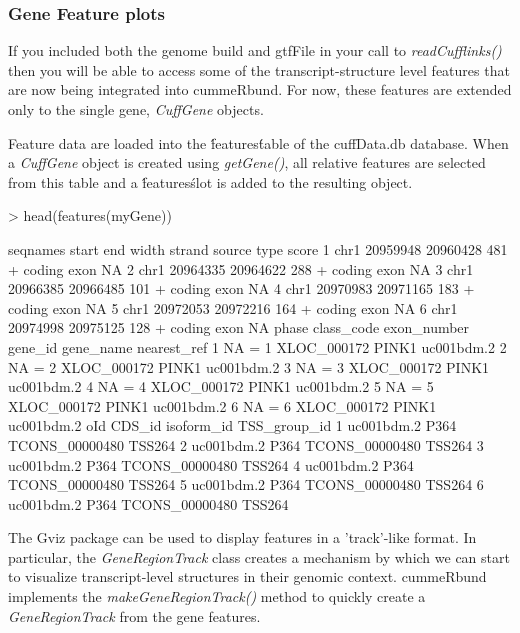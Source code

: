 \documentclass[10pt]{article}
\newcommand{\Rpackage}[1]{\textsf{#1}}
\newcommand{\Rclass}[1]{{\textit{#1}}}
\newcommand{\Rmethod}[1]{{\textit{#1}}}
\begin{document}
\clearpage

\subsubsection{Gene Feature plots}
If you included both the genome build and gtfFile in your call to \Rmethod{readCufflinks()} then you will be able to access some of the transcript-structure level features that are now being integrated into cummeRbund. For now, these features are extended only to the single gene, \Rclass{CuffGene} objects.

Feature data are loaded into the \'features\' table of the cuffData.db database. When a \Rclass{CuffGene} object is created using \Rmethod{getGene()}, all relative features are selected from this table and a \'features\' slot is added to the resulting object.

\begin{Schunk}
\begin{Sinput}
> head(features(myGene))
\end{Sinput}
\begin{Soutput}
  seqnames    start      end width strand source type score
1     chr1 20959948 20960428   481      + coding exon    NA
2     chr1 20964335 20964622   288      + coding exon    NA
3     chr1 20966385 20966485   101      + coding exon    NA
4     chr1 20970983 20971165   183      + coding exon    NA
5     chr1 20972053 20972216   164      + coding exon    NA
6     chr1 20974998 20975125   128      + coding exon    NA
  phase class_code exon_number     gene_id gene_name nearest_ref
1    NA          =           1 XLOC_000172     PINK1  uc001bdm.2
2    NA          =           2 XLOC_000172     PINK1  uc001bdm.2
3    NA          =           3 XLOC_000172     PINK1  uc001bdm.2
4    NA          =           4 XLOC_000172     PINK1  uc001bdm.2
5    NA          =           5 XLOC_000172     PINK1  uc001bdm.2
6    NA          =           6 XLOC_000172     PINK1  uc001bdm.2
         oId CDS_id     isoform_id TSS_group_id
1 uc001bdm.2   P364 TCONS_00000480       TSS264
2 uc001bdm.2   P364 TCONS_00000480       TSS264
3 uc001bdm.2   P364 TCONS_00000480       TSS264
4 uc001bdm.2   P364 TCONS_00000480       TSS264
5 uc001bdm.2   P364 TCONS_00000480       TSS264
6 uc001bdm.2   P364 TCONS_00000480       TSS264
\end{Soutput}
\end{Schunk}

The \Rpackage{Gviz} package can be used to display features in a 'track'-like format. In particular, the \Rclass{GeneRegionTrack} class creates a mechanism by which we can start to visualize transcript-level structures in their genomic context. \Rpackage{cummeRbund} implements the \Rmethod{makeGeneRegionTrack()} method to quickly create a \Rclass{GeneRegionTrack} from the gene features.
\end{document}
